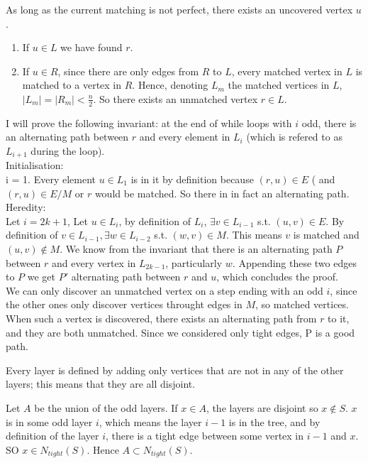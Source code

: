 \documentclass{scrartcl}
\begin{document}
As long as the current matching is not perfect, there exists an uncovered vertex \( u \).
\begin{enumerate}
\item If \( u \in L \) we have found \( r \).
\item If \( u \in R \), since there are only edges from \( R \) to \( L \), every matched vertex in \( L \) is matched to a vertex in \( R \). Hence, denoting \( L_m \) the matched vertices in \( L \), \( |L_m| = |R_m| < \frac{n}{2} \). So there exists an unmatched vertex \( r \in L \).
\end{enumerate}

I will prove the following invariant: at the end of while loops with \( i \) odd, there is an alternating path between \( r \) and every element in \( L_i \) (which is refered to as \( L_{i+1} \) during the loop). \\
Initialisation: \\
i = 1. Every element \( u \in L_1 \) is in it by definition because \( (r,u) \in E \) ( and \( (r,u) \in E / M \) or \( r \) would be matched. So there in in fact an alternating path. \\
Heredity: \\
Let \( i = 2k + 1 \),  Let \( u \in L_i \), by definition of \( L_i \), \( \exists v \in L_{i - 1} \) s.t. \( (u,v) \in E \). 
By definition of \( v \in L_{i-1}, \exists w \in L_{i-2} \) s.t. \( (w,v) \in M \). This means \( v \) is matched and \( (u,v) \not \in M \).
We know from the invariant that there is an alternating path \( P \) between \( r \) and every vertex in \( L_{2k - 1} \), particularly \( w \).
Appending these two edges to \( P \) we get \( P' \) alternating path between \( r \) and \( u \), which concludes the proof. \\

We can only discover an unmatched vertex on a step ending with an odd \( i \), since the other ones only discover vertices throught edges in \( M \), so matched vertices. When such a vertex is discovered, there exists an alternating path from \( r \) to it, and they are both unmatched. Since we considered only tight edges, P is a good path.

Every layer is defined by adding only vertices that are not in any of the other layers; this means that they are all disjoint.

Let \( A \) be the union of the odd layers.
If \( x \in A \), the layers are disjoint so \( x \not \in S \). \( x \) is in some odd layer \( i \), which means the layer \( i - 1 \) is in the tree, and by definition of the layer \( i \), there is a tight edge between some vertex in \( i - 1 \) and \( x \). SO \( x \in N_{tight}(S) \). Hence \( A \subset N_{tight}(S) \). \\
\end{document}
